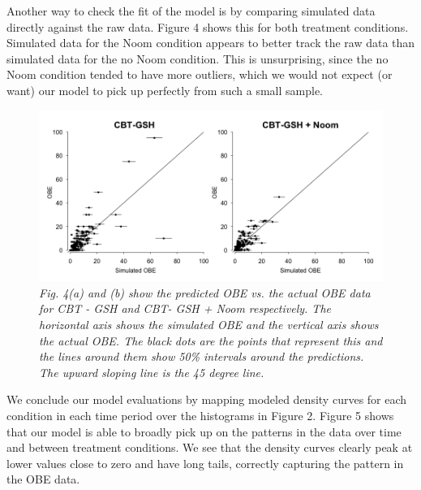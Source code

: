 \documentclass{article}
\begin{document}
%
Another way to check the fit of the model is by comparing simulated data directly against the raw data.  Figure 4 shows this for both treatment conditions.  Simulated data for the Noom condition appears to better track the raw data than simulated data for the no Noom condition.  This is unsurprising, since the no Noom condition tended to have more outliers, which we would not expect (or want) our model to pick up perfectly from such a small sample.  
%
\begin{figure}[H]
\begin{center}
\includegraphics[width=\textwidth, height=\textheight, keepaspectratio]{obe_ppcs.png}
\caption{\emph{Fig. 4(a) and (b) show the predicted OBE vs. the actual OBE data for CBT - GSH and CBT- GSH + Noom respectively. The horizontal axis shows the simulated OBE and the vertical axis shows the actual OBE. The black dots are the points that represent this and the lines around them show 50\% intervals around the predictions. The upward sloping line is the 45 degree line.}}
\end{center}
\end{figure}
%
We conclude our model evaluations by mapping modeled density curves for each condition in each time period over the histograms in Figure 2.  Figure 5 shows that our model is able to broadly pick up on the patterns in the data over time and between treatment conditions. We see that the density curves clearly peak at lower values close to zero and have long tails, correctly capturing the pattern in the OBE data.
\end{document}
